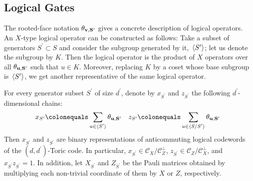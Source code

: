 \subsection{Logical Gates}

\label{subsection:logical}
The rooted-face notation $\mathbf{\theta_{v ,S^{\prime}}{} }{}$ gives a concrete description of logical operators. An $X$-type logical operator can be constructed as follows: Take a subset of generators $S^{\prime} \subset S$ and consider the subgroup generated by it, $\expval*{S^{\prime}}$; let us denote the subgroup by $K$. Then the logical operator is the product of $X$ operators over all $\mathbf{\theta_{u ,S^{\prime}} }$ such that $u \in K$. Moreover, replacing $K$ by a coset whose base subgroup is $\expval*{S^{\prime}}$, we get another representative of the same logical operator.
\begin{claim}
  For every generator subset $S^{\prime}$ of size $d^{\prime}$, denote by $x_{S^{\prime}}$ and $z_{S^{\prime}}$ the following $d^{\prime}$-dimensional chains: 
\begin{equation*}
  \begin{split}
    x_{S^{\prime}}  \colonequals \sum_{u \in \expval*{S^{\prime}} }\rotfv{u}{S^{\prime}} \ \ \ z_{S^{\prime}} \colonequals \sum_{u \in \expval*{S/S^{\prime}} }\rotfv{u}{S^{\prime}} 
  \end{split}
\end{equation*}
Then $x_{S^{\prime}}$ and $z_{S^{\prime}}$ are binary representations of anticommuting logical codewords of the $(d,d^{\prime})$-Toric code. In particular, $x_{S^{\prime}} \in \mathcal{C}_{X}/\mathcal{C}_{Z}^{\perp}$, $z_{S^{\prime}} \in \mathcal{C}_{Z}/\mathcal{C}_{X}^{\perp}$, and $x_{S^{\prime}} z_{S^{\prime}} = 1$. In addition, let $X_{S^{\prime}}$ and $Z_{S^{\prime}}$ be the Pauli matrices obtained by multiplying each non-trivial coordinate of them by $X$ or $Z$, respectively.
\end{claim}
